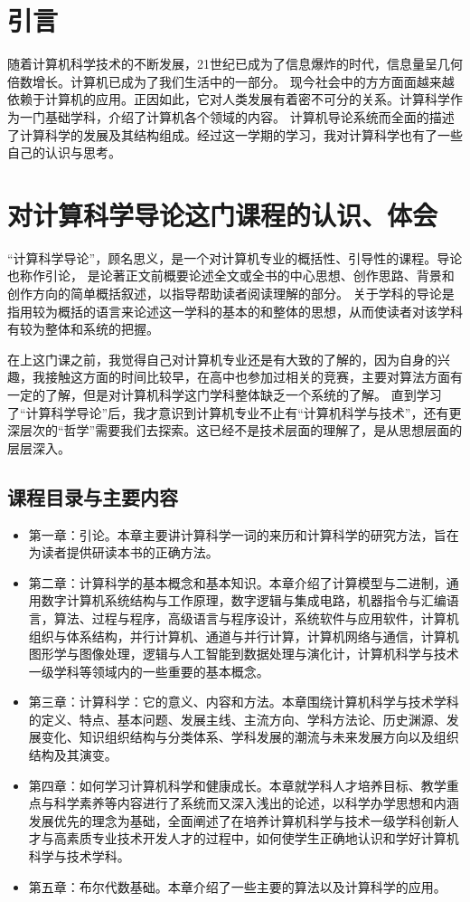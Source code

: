 \documentclass{article}
\begin{document}
\thispagestyle{empty}
\newpage
\setcounter{page}{1}

\section{引言}
	随着计算机科学技术的不断发展，21世纪已成为了信息爆炸的时代，信息量呈几何倍数增长。计算机已成为了我们生活中的一部分。
现今社会中的方方面面越来越依赖于计算机的应用。正因如此，它对人类发展有着密不可分的关系。计算科学作为一门基础学科，介绍了计算机各个领域的内容。
计算机导论系统而全面的描述了计算科学的发展及其结构组成。经过这一学期的学习，我对计算科学也有了一些自己的认识与思考。

\section{对计算科学导论这门课程的认识、体会}
“计算科学导论”，顾名思义，是一个对计算机专业的概括性、引导性的课程。导论也称作引论，
是论著正文前概要论述全文或全书的中心思想、创作思路、背景和创作方向的简单概括叙述，以指导帮助读者阅读理解的部分。
关于学科的导论是指用较为概括的语言来论述这一学科的基本的和整体的思想，从而使读者对该学科有较为整体和系统的把握。\par
在上这门课之前，我觉得自己对计算机专业还是有大致的了解的，因为自身的兴趣，我接触这方面的时间比较早，在高中也参加过相关的竞赛，主要对算法方面有一定的了解，但是对计算机科学这门学科整体缺乏一个系统的了解。
直到学习了“计算科学导论”后，我才意识到计算机专业不止有“计算机科学与技术”，还有更深层次的“哲学”需要我们去探索。这已经不是技术层面的理解了，是从思想层面的层层深入。\par
\subsection{课程目录与主要内容}
\begin{itemize}
	\item 第一章：引论。本章主要讲计算科学一词的来历和计算科学的研究方法，旨在为读者提供研读本书的正确方法。
	\item 第二章：计算科学的基本概念和基本知识。本章介绍了计算模型与二进制，通用数字计算机系统结构与工作原理，数字逻辑与集成电路，机器指令与汇编语言，算法、过程与程序，高级语言与程序设计，系统软件与应用软件，计算机组织与体系结构，并行计算机、通道与并行计算，计算机网络与通信，计算机图形学与图像处理，逻辑与人工智能到数据处理与演化计，计算机科学与技术一级学科等领域内的一些重要的基本概念。
	\item 第三章：计算科学：它的意义、内容和方法。本章围绕计算机科学与技术学科的定义、特点、基本问题、发展主线、主流方向、学科方法论、历史渊源、发展变化、知识组织结构与分类体系、学科发展的潮流与未来发展方向以及组织结构及其演变。
	\item 第四章：如何学习计算机科学和健康成长。本章就学科人才培养目标、教学重点与科学素养等内容进行了系统而又深入浅出的论述，以科学办学思想和内涵发展优先的理念为基础，全面阐述了在培养计算机科学与技术一级学科创新人才与高素质专业技术开发人才的过程中，如何使学生正确地认识和学好计算机科学与技术学科。
	\item 第五章：布尔代数基础。本章介绍了一些主要的算法以及计算科学的应用。
	\end{itemize}
\end{document}
